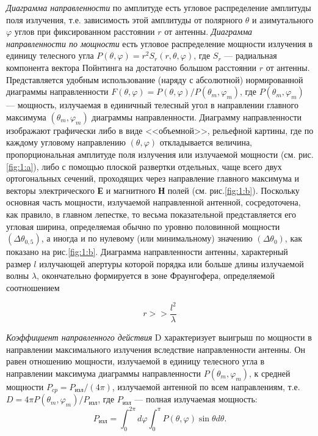 \textit{Диаграмма направленности} по амплитуде есть угловое распределение амплитуды поля излучения, т.е. зависимость этой
амплитуды от полярного $\theta $ и азимутального $ \varphi $ углов при фиксированном расстоянии $r$ от антенны. \textit{Диаграмма направленности
по мощности} есть угловое распределение мощности излучения в единицу телесного угла $P(\theta, \varphi)=r^{2} S_{r}(r, \theta, \varphi)$,
где $S_{r}$ — радиальная компонента вектора Пойнтинга на достаточно большом расстоянии $r$ от антенны. Представляется 
удобным использование (наряду с абсолютной) нормированной диаграммы направленности $F(\theta,\varphi) = P(\theta,\varphi)/P(\theta_m,\varphi_m)$,
где $P(\theta_m,\varphi_m)$ — мощность, излучаемая в единичный телесный угол в направлении главного максимума $(\theta_m,\varphi_m)$ диаграммы
направленности. Диаграмму направленности изображают графически либо в виде <<объемной>>, рельефной картины, где по
каждому угловому направлению $(\theta,\varphi)$ откладывается величина, пропорциональная амплитуде поля излучения или излучаемой 
мощности (см. рис. \ref{fig:1:a}), либо с помощью плоской развертки отдельных, чаще всего двух ортогональных сечений, проходящих 
через направление главного максимума и векторы электрического \textbf{Е} и магнитного \textbf{Н} полей (см. рис.\ref{fig:1:b}). Поскольку основная
часть мощности, излучаемой направленной антенной, сосредоточена, как правило, в главном лепестке, то весьма показательной
представляется его угловая ширина, определяемая обычно по уровню половинной мощности $ \left(\Delta \theta_{0,5}\right) $, а иногда и по нулевому (или минимальному) значению
$ \left(\Delta \theta_{0}\right) $, как показано на рис.\ref{fig:1:b}. Диаграмма направленности антенны, характерный размер $l$
излучающей апертуры которой порядка или больше длины излучаемой волны $\lambda$, окончательно формируется в зоне Фраунгофера,
определяемой соотношением 

\begin{equation}
    r>>\frac{l^2}{\lambda}
    \label{eq:1}
\end{equation}

\textit{Коэффициент направленного действия} D характеризует
выигрыш по  мощности в направлении максимального излучения вследствие направленности антенны. Он равен отношению 
мощности, излучаемой в единицу телесного угла в направлении максимума диаграммы направленности $P(\theta_m,\varphi_m)$, к средней 
мощности $P_{cp} = P_{\text{изл}} /(4\pi)$, излучаемой антенной по всем направлениям, т.е. $ D=4 \pi
P\left(\theta_{m}, \varphi_{m}\right) / P_{\text{изл}} $, где $P_{\text{изл}} $ — полная излучаемая мощность:
$$  P_{\text{изл}} = \int_0^{2\pi}d\varphi \int_0^\pi P( \theta,\varphi ) \sin{\theta}d \theta. $$

